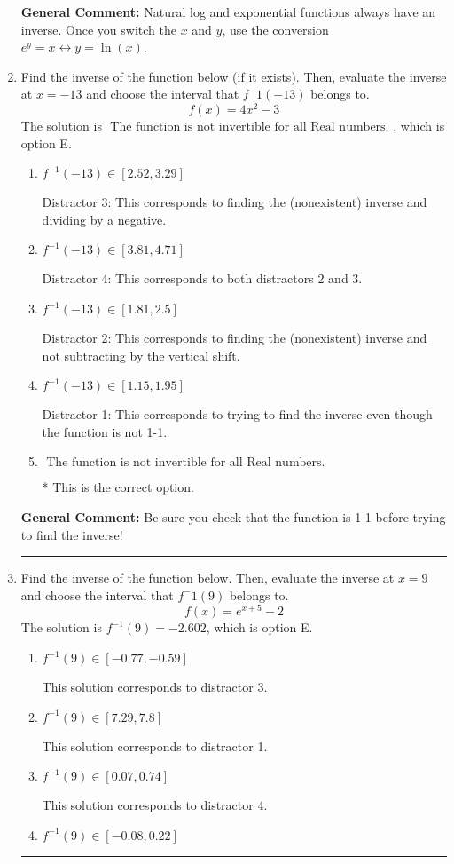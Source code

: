 \documentclass{extbook}[14pt]
\newcommand{\litem}[1]{\item #1

\rule{\textwidth}{0.4pt}}
\begin{document}
\begin{enumerate}
{\textbf{General Comment:} Natural log and exponential functions always have an inverse. Once you switch the $x$ and $y$, use the conversion $ e^y = x \leftrightarrow y=\ln(x)$.
}
\litem{
Find the inverse of the function below (if it exists). Then, evaluate the inverse at $x = -13$ and choose the interval that $f^-1(-13)$ belongs to.
\[ f(x) = 4 x^2 - 3 \]The solution is \( \text{ The function is not invertible for all Real numbers. } \), which is option E.\begin{enumerate}[label=\Alph*.]
\item \( f^{-1}(-13) \in [2.52, 3.29] \)

 Distractor 3: This corresponds to finding the (nonexistent) inverse and dividing by a negative.
\item \( f^{-1}(-13) \in [3.81, 4.71] \)

 Distractor 4: This corresponds to both distractors 2 and 3.
\item \( f^{-1}(-13) \in [1.81, 2.5] \)

 Distractor 2: This corresponds to finding the (nonexistent) inverse and not subtracting by the vertical shift.
\item \( f^{-1}(-13) \in [1.15, 1.95] \)

 Distractor 1: This corresponds to trying to find the inverse even though the function is not 1-1. 
\item \( \text{ The function is not invertible for all Real numbers. } \)

* This is the correct option.
\end{enumerate}

\textbf{General Comment:} Be sure you check that the function is 1-1 before trying to find the inverse!
}
\litem{
Find the inverse of the function below. Then, evaluate the inverse at $x = 9$ and choose the interval that $f^-1(9)$ belongs to.
\[ f(x) = e^{x+5}-2 \]The solution is \( f^{-1}(9) = -2.602 \), which is option E.\begin{enumerate}[label=\Alph*.]
\item \( f^{-1}(9) \in [-0.77, -0.59] \)

 This solution corresponds to distractor 3.
\item \( f^{-1}(9) \in [7.29, 7.8] \)

 This solution corresponds to distractor 1.
\item \( f^{-1}(9) \in [0.07, 0.74] \)

 This solution corresponds to distractor 4.
\item \( f^{-1}(9) \in [-0.08, 0.22] \)


\end{enumerate}}
\end{enumerate}
\end{document}
